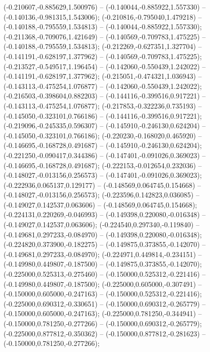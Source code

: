  (-0.210607,-0.885629,1.500976) -- (-0.140044,-0.885922,1.557330) -- (-0.140136,-0.981315,1.543006);
 (-0.210816,-0.795040,1.479218) -- (-0.140188,-0.795559,1.534813) -- (-0.140044,-0.885922,1.557330);
 (-0.211368,-0.709076,1.421649) -- (-0.140569,-0.709783,1.475225) -- (-0.140188,-0.795559,1.534813);
 (-0.212269,-0.627351,1.327704) -- (-0.141191,-0.628197,1.377962) -- (-0.140569,-0.709783,1.475225);
 (-0.213527,-0.549517,1.196454) -- (-0.142060,-0.550439,1.242022) -- (-0.141191,-0.628197,1.377962);
 (-0.215051,-0.474321,1.036943) -- (-0.143113,-0.475254,1.076877) -- (-0.142060,-0.550439,1.242022);
 (-0.216503,-0.398604,0.882203) -- (-0.144116,-0.399516,0.917221) -- (-0.143113,-0.475254,1.076877);
 (-0.217853,-0.322236,0.735193) -- (-0.145050,-0.323101,0.766186) -- (-0.144116,-0.399516,0.917221);
 (-0.219096,-0.245335,0.596307) -- (-0.145910,-0.246130,0.624204) -- (-0.145050,-0.323101,0.766186);
 (-0.220230,-0.168020,0.465920) -- (-0.146695,-0.168728,0.491687) -- (-0.145910,-0.246130,0.624204);
 (-0.221250,-0.090417,0.344386) -- (-0.147401,-0.091026,0.369023) -- (-0.146695,-0.168728,0.491687);
 (-0.222153,-0.012654,0.232036) -- (-0.148027,-0.013156,0.256573) -- (-0.147401,-0.091026,0.369023);
 (-0.222936,0.065137,0.129177) -- (-0.148569,0.064745,0.154668) -- (-0.148027,-0.013156,0.256573);
 (-0.223596,0.142823,0.036085) -- (-0.149027,0.142537,0.063606) -- (-0.148569,0.064745,0.154668);
 (-0.224131,0.220269,-0.046993) -- (-0.149398,0.220080,-0.016348) -- (-0.149027,0.142537,0.063606);
 (-0.224540,0.297340,-0.119840) -- (-0.149681,0.297233,-0.084970) -- (-0.149398,0.220080,-0.016348);
 (-0.224820,0.373900,-0.182275) -- (-0.149875,0.373855,-0.142070) -- (-0.149681,0.297233,-0.084970);
 (-0.224971,0.449814,-0.234151) -- (-0.149980,0.449807,-0.187500) -- (-0.149875,0.373855,-0.142070);
 (-0.225000,0.525313,-0.275460) -- (-0.150000,0.525312,-0.221416) -- (-0.149980,0.449807,-0.187500);
 (-0.225000,0.605000,-0.307491) -- (-0.150000,0.605000,-0.247163) -- (-0.150000,0.525312,-0.221416);
 (-0.225000,0.690312,-0.330651) -- (-0.150000,0.690312,-0.265779) -- (-0.150000,0.605000,-0.247163);
 (-0.225000,0.781250,-0.344941) -- (-0.150000,0.781250,-0.277266) -- (-0.150000,0.690312,-0.265779);
 (-0.225000,0.877812,-0.350362) -- (-0.150000,0.877812,-0.281623) -- (-0.150000,0.781250,-0.277266);
